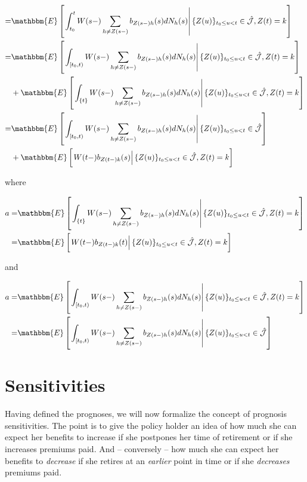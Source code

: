 \documentclass{book}
\newcommand{\1}[1]{\mathbbm{1}_{\left\lbrace #1 \right\rbrace}}
\newcommand{\econd}[2][def]{\mathbbm{E} \left[ \left. #1 \right| #2 \right]}
\theoremstyle{break}
\theoremstyle{remark}
\numberwithin{equation}{section}
\begin{document}
\begin{align*}
	=& \econd[\int_{t_0}^t W(s-) \sum_{h \neq Z(s-)} b_{Z(s-)h}(s) dN_h(s)]{ \{ Z(u) \}_{t_0 \leq u < t} \in \hat{\mathcal{J}}, Z(t) = k} \\
	=& \econd[\int_{[t_0,t)} W(s-) \sum_{h \neq Z(s-)} b_{Z(s-)h}(s) dN_h(s)]{ \{ Z(u) \}_{t_0 \leq u < t} \in \hat{\mathcal{J}}, Z(t) = k} \\
	&+ \econd[\int_{\{t\}} W(s-) \sum_{h \neq Z(s-)} b_{Z(s-)h}(s) dN_h(s)]{ \{ Z(u) \}_{t_0 \leq u < t} \in \hat{\mathcal{J}}, Z(t) = k} \\
	=& \econd[\int_{[t_0,t)} W(s-) \sum_{h \neq Z(s-)} b_{Z(s-)h}(s) dN_h(s)]{ \{ Z(u) \}_{t_0 \leq u < t} \in \hat{\mathcal{J}}} \\
	&+ \econd[W(t-) b_{Z(t-)k}(s)]{ \{ Z(u) \}_{t_0 \leq u < t} \in \hat{\mathcal{J}}, Z(t) = k} 
\end{align*}

where

\begin{align*}
	a =& \econd[\int_{\{t\}} W(s-) \sum_{h \neq Z(s-)} b_{Z(s-)h}(s) dN_h(s)]{ \{ Z(u) \}_{t_0 \leq u < t} \in \hat{\mathcal{J}}, Z(t) = k} \\
	=& \econd[W(t-) b_{Z(t-)k}(t)]{ \{ Z(u) \}_{t_0 \leq u < t} \in \hat{\mathcal{J}}, Z(t) = k} 
\end{align*}

and

\begin{align*}
	a =& \econd[\int_{[t_0,t)} W(s-) \sum_{h \neq Z(s-)} b_{Z(s-)h}(s) dN_h(s)]{ \{ Z(u) \}_{t_0 \leq u < t} \in \hat{\mathcal{J}}, Z(t) = k} \\
	=& \econd[\int_{[t_0,t)} W(s-) \sum_{h \neq Z(s-)} b_{Z(s-)h}(s) dN_h(s)]{ \{ Z(u) \}_{t_0 \leq u < t} \in \hat{\mathcal{J}}}
\end{align*}

\chapter{Sensitivities}

Having defined the prognoses, we will now formalize the concept of prognosis sensitivities. The point is to give the policy holder an idea of how much she can expect her benefits to increase if she postpones her time of retirement or if she increases premiums paid. And -- conversely -- how much she can expect her benefits to \textit{decrease} if she retires at an \textit{earlier} point in time or if she \textit{decreases} premiums paid.
\end{document}
